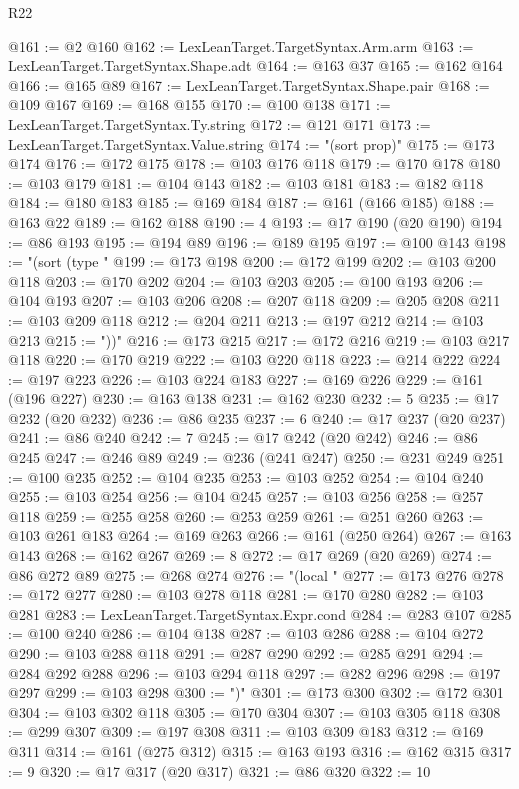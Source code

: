 \begin{lexlean}{R22}
\begin{coremodule}
{{{{{{{{{{{{{{{{{{{{{{{{{{{{{{{{{{{{{{{{{{{{{{{{{{{{@161 := @2 @160
@162 := LexLeanTarget.TargetSyntax.Arm.arm
@163 := LexLeanTarget.TargetSyntax.Shape.adt
@164 := @163 @37
@165 := @162 @164
@166 := @165 @89
@167 := LexLeanTarget.TargetSyntax.Shape.pair
@168 := @109 @167
@169 := @168 @155
@170 := @100 @138
@171 := LexLeanTarget.TargetSyntax.Ty.string
@172 := @121 @171
@173 := LexLeanTarget.TargetSyntax.Value.string
@174 := "(sort prop)"
@175 := @173 @174
@176 := @172 @175
@178 := @103 @176 @118
@179 := @170 @178
@180 := @103 @179
@181 := @104 @143
@182 := @103 @181
@183 := @182 @118
@184 := @180 @183
@185 := @169 @184
@187 := @161 (@166 @185)
@188 := @163 @22
@189 := @162 @188
@190 := 4
@193 := @17 @190 (@20 @190)
@194 := @86 @193
@195 := @194 @89
@196 := @189 @195
@197 := @100 @143
@198 := "(sort (type "
@199 := @173 @198
@200 := @172 @199
@202 := @103 @200 @118
@203 := @170 @202
@204 := @103 @203
@205 := @100 @193
@206 := @104 @193
@207 := @103 @206
@208 := @207 @118
@209 := @205 @208
@211 := @103 @209 @118
@212 := @204 @211
@213 := @197 @212
@214 := @103 @213
@215 := "))"
@216 := @173 @215
@217 := @172 @216
@219 := @103 @217 @118
@220 := @170 @219
@222 := @103 @220 @118
@223 := @214 @222
@224 := @197 @223
@226 := @103 @224 @183
@227 := @169 @226
@229 := @161 (@196 @227)
@230 := @163 @138
@231 := @162 @230
@232 := 5
@235 := @17 @232 (@20 @232)
@236 := @86 @235
@237 := 6
@240 := @17 @237 (@20 @237)
@241 := @86 @240
@242 := 7
@245 := @17 @242 (@20 @242)
@246 := @86 @245
@247 := @246 @89
@249 := @236 (@241 @247)
@250 := @231 @249
@251 := @100 @235
@252 := @104 @235
@253 := @103 @252
@254 := @104 @240
@255 := @103 @254
@256 := @104 @245
@257 := @103 @256
@258 := @257 @118
@259 := @255 @258
@260 := @253 @259
@261 := @251 @260
@263 := @103 @261 @183
@264 := @169 @263
@266 := @161 (@250 @264)
@267 := @163 @143
@268 := @162 @267
@269 := 8
@272 := @17 @269 (@20 @269)
@274 := @86 @272 @89
@275 := @268 @274
@276 := "(local "
@277 := @173 @276
@278 := @172 @277
@280 := @103 @278 @118
@281 := @170 @280
@282 := @103 @281
@283 := LexLeanTarget.TargetSyntax.Expr.cond
@284 := @283 @107
@285 := @100 @240
@286 := @104 @138
@287 := @103 @286
@288 := @104 @272
@290 := @103 @288 @118
@291 := @287 @290
@292 := @285 @291
@294 := @284 @292 @288
@296 := @103 @294 @118
@297 := @282 @296
@298 := @197 @297
@299 := @103 @298
@300 := ")"
@301 := @173 @300
@302 := @172 @301
@304 := @103 @302 @118
@305 := @170 @304
@307 := @103 @305 @118
@308 := @299 @307
@309 := @197 @308
@311 := @103 @309 @183
@312 := @169 @311
@314 := @161 (@275 @312)
@315 := @163 @193
@316 := @162 @315
@317 := 9
@320 := @17 @317 (@20 @317)
@321 := @86 @320
@322 := 10
}}}}}}}}}}}}}}}}}}}}}}}}}}}}}}}}}}}}}}}}}}}}}}}}}}}}
\end{coremodule}
\end{lexlean}
